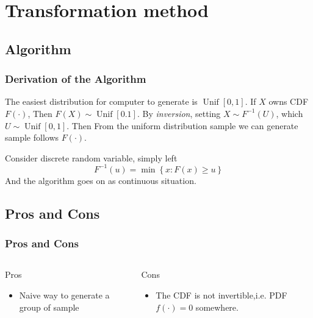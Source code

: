 \section{Transformation method}
\subsection{Algorithm}

\begin{frame}
    \frametitle{Derivation of the Algorithm}

    The easiest distribution for computer to generate is \(\operatorname{Unif}[0,1]\). If \(X\) owns CDF \(F(\cdot)\), Then \(F(X) \sim \operatorname{Unif}[0.1]\). By \textit{inversion}, setting \(X \sim F^{-1}(U)\), which \(U \sim \operatorname{Unif}[0,1]\). Then From the uniform distribution sample we can generate sample follows \(F(\cdot)\).
    \vspace*{1em}

    Consider discrete random variable, simply left
    \[F^{-1} (u) = \min\left\{x:F(x)\geq u\right\}\]
    And the algorithm goes on as continuous situation.

\end{frame}
\subsection{Pros and Cons}
\begin{frame}
    \frametitle{Pros and Cons}
    \begin{columns}
        \begin{block}{Pros}
            \begin{itemize}
                \item Naive way to generate a group of sample
                \\
            \end{itemize}
        \end{block}
        
        \begin{block}{Cons}
            \begin{itemize}
                \item The CDF is not invertible,i.e. PDF \(f(\cdot) = 0\) somewhere.
            \end{itemize}
        \end{block}

        
    \end{columns}
    
\end{frame}
